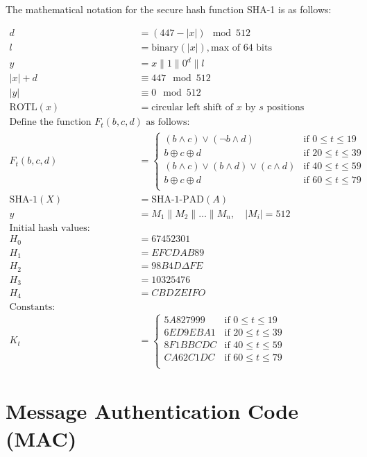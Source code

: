 \documentclass[11pt]{article}
\begin{document}
The mathematical notation for the secure hash function SHA-1 is as follows:

\begin{align*}
d &= (447 - |x|) \mod 512 \\
l &= \text{binary}(|x|), \text{max of 64 bits} \\
y &= x \mathbin\| 1 \mathbin\| 0^d \mathbin\| l \\
|x| + d &\equiv 447 \mod 512 \\
|y| &\equiv 0 \mod 512 \\
\text{ROTL}(x) &= \text{circular left shift of } x \text{ by } s \text{ positions} \\
\text{Define the function } F_t(b, c, d) \text{ as follows:} \\
F_t(b, c, d) &=
\begin{cases}
(b \land c) \lor (\lnot b \land d) & \text{if } 0 \leq t \leq 19 \\
b \oplus c \oplus d & \text{if } 20 \leq t \leq 39 \\
(b \land c) \lor (b \land d) \lor (c \land d) & \text{if } 40 \leq t \leq 59 \\
b \oplus c \oplus d & \text{if } 60 \leq t \leq 79 \\
\end{cases} \\
\text{SHA-1}(X) &= \text{SHA-1-PAD}(A) \\
y &= M_1 \mathbin\| M_2 \mathbin\| \ldots \mathbin\| M_n, \quad |M_i| = 512 \\
\text{Initial hash values:} \\
H_0 &= 67452301 \\
H_1 &= EFCDAB89 \\
H_2 &= 98B4D\Delta FE \\
H_3 &= 10325476 \\
H_4 &= CBDZEIFO \\
\text{Constants:} \\
K_t &=
\begin{cases}
5A827999 & \text{if } 0 \leq t \leq 19 \\
6ED9EBA1 & \text{if } 20 \leq t \leq 39 \\
8F1BBCDC & \text{if } 40 \leq t \leq 59 \\
CA62C1DC & \text{if } 60 \leq t \leq 79 \\
\end{cases}
\end{align*}

\section*{Message Authentication Code (MAC)}
\end{document}
